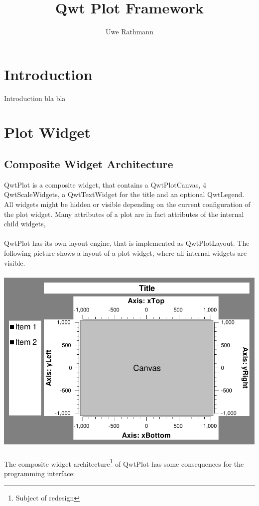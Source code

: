 \documentclass[12pt,a4paper]{book}
\author{Uwe Rathmann}
\title{Qwt Plot Framework}
\begin{document}
\maketitle
\pagestyle{headings}

\tableofcontents

\chapter{Introduction}

Introduction bla bla

\chapter{Plot Widget}

\section{Composite Widget Architecture}

QwtPlot is a composite widget, that contains a QwtPlotCanvas, 
4 QwtScaleWidgets, a QwtTextWidget for the title and an optional QwtLegend. All widgets might be hidden or visible depending on the current configuration of the plot widget. Many attributes of a plot are in fact attributes of the internal child widgets,
\\
\\
QwtPlot has its own layout engine, that is implemented as QwtPlotLayout. The following picture shows a layout of a plot widget, where all internal widgets are visible.
\\
\\
\includegraphics[scale=1.0]{plotlayout.pdf}
\\
\\
The composite widget architecture\footnote{Subject of redesign} of QwtPlot has some consequences for the programming interface:
\end{document}
